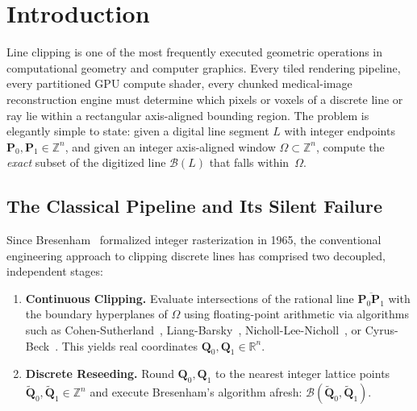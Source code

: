 \documentclass[12pt,a4paper]{article}
\theoremstyle{definition}
\newcommand{\R}{\mathbb{R}}
\newcommand{\Bresen}{\mathcal{B}}
\begin{document}
\newpage
\tableofcontents
\newpage

\section{Introduction}
\label{sec:intro}

Line clipping is one of the most frequently executed
geometric operations in computational geometry and computer
graphics.  Every tiled rendering pipeline, every partitioned
GPU compute shader, every chunked medical-image
reconstruction engine must determine which pixels or voxels
of a discrete line or ray lie within a rectangular
axis-aligned bounding region.  The problem is elegantly
simple to state: given a digital line segment $L$ with
integer endpoints $\mathbf{P}_0, \mathbf{P}_1 \in
\mathbb{Z}^n$, and given an integer axis-aligned window
$\Omega \subset \mathbb{Z}^n$, compute the \emph{exact}
subset of the digitized line $\Bresen(L)$ that falls
within~$\Omega$.

\subsection{The Classical Pipeline and Its Silent Failure}

Since Bresenham~\cite{bresenham1965algorithm} formalized
integer rasterization in 1965, the conventional engineering
approach to clipping discrete lines has comprised two
decoupled, independent stages:

\begin{enumerate}
\item[(S1)] \textbf{Continuous Clipping.}
  Evaluate intersections of the rational line
  $\overline{\mathbf{P}_0\mathbf{P}_1}$ with the boundary
  hyperplanes of $\Omega$ using floating-point arithmetic
  via algorithms such as Cohen-Sutherland~\cite{sproull1968clipping},
  Liang-Barsky~\cite{liang1984new},
  Nicholl-Lee-Nicholl~\cite{nicholl1987efficient}, or
  Cyrus-Beck~\cite{cyrus1978generalized}. This yields real
  coordinates $\mathbf{Q}_0, \mathbf{Q}_1 \in \R^n$.

\item[(S2)] \textbf{Discrete Reseeding.}
  Round $\mathbf{Q}_0, \mathbf{Q}_1$ to the nearest integer
  lattice points $\tilde{\mathbf{Q}}_0, \tilde{\mathbf{Q}}_1
  \in \mathbb{Z}^n$ and execute Bresenham's algorithm afresh:
  $\Bresen(\tilde{\mathbf{Q}}_0, \tilde{\mathbf{Q}}_1)$.
\end{enumerate}
\end{document}
